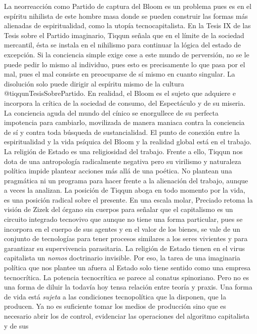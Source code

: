 \documentclass[
]{article}
\begin{document}
La neorreacción como Partido de captura del Bloom es un problema pues es
en el espíritu nihilista de este hombre masa donde se pueden construir
las formas más alienadas de espiritualidad, como la utopía
tecnocapitalista. En la Tesis IX de las Tesis sobre el Partido
imaginario, Tiqqun señala que en el límite de la sociedad mercantil,
ésta se instala en el nihilismo para continuar la lógica del estado de
excepción. Si la conciencia simple exige cese a este mundo de
perversión, no se le puede pedir lo mismo al individuo, pues esto es
precisamente lo que pasa por el mal, pues el mal consiste en preocuparse
de sí mismo en cuanto singular. La disolución solo puede dirigir al
espíritu mismo de la cultura @tiqqunTesisSobrePartido. En realidad, el
Bloom es el sujeto que adquiere e incorpora la crítica de la sociedad de
consumo, del Espectáculo y de su miseria. La conciencia aguda del mundo
del cínico se enorgullece de su perfecta impotencia para cambiarlo,
movilizada de manera maniaca contra la conciencia de sí y contra toda
búsqueda de sustancialidad. El punto de conexión entre la espiritualidad
y la vida psíquica del Bloom y la realidad global está en el trabajo. La
religión de Estado es una religiosidad del trabajo. Frente a ello,
Tiqqun nos dota de una antropología radicalmente negativa pero su
virilismo y naturaleza política impide plantear acciones más allá de una
poética. No plantean una pragmática ni un programa para hacer frente a
la alienación del trabajo, aunque a veces la analizan. La posición de
Tiqqun aboga en todo momento por la vida, es una posición radical sobre
el presente. En una escala molar, Preciado retoma la visión de Zizek del
órgano sin cuerpos para señalar que el capitalismo es un circuito
integrado tecnovivo que aunque no tiene una forma particular, pues se
incorpora en el cuerpo de sus agentes y en el valor de los bienes, se
vale de un conjunto de tecnologías para tener procesos similares a los
seres vivientes y para garantizar su supervivencia parasitaria. La
religión de Estado tienen en el virus capitalista un \emph{nomos}
doctrinario invisible. Por eso, la tarea de una imaginaria política que
nos plantee un afuera al Estado solo tiene sentido como una empresa
tecnocrítica. La potencia tecnocrítica se parece al conatus spinoziano.
Pero no es una forma de diluir la todavía hoy tensa relación entre
teoría y praxis. Una forma de vida está \emph{sujeta} a las condiciones
tecnopolítica que la disponen, que la producen. Ya no es suficiente
tomar los medios de producción sino que es necesario abrir los de
control, evidenciar las operaciones del algoritmo capitalista y de sus
\end{document}
